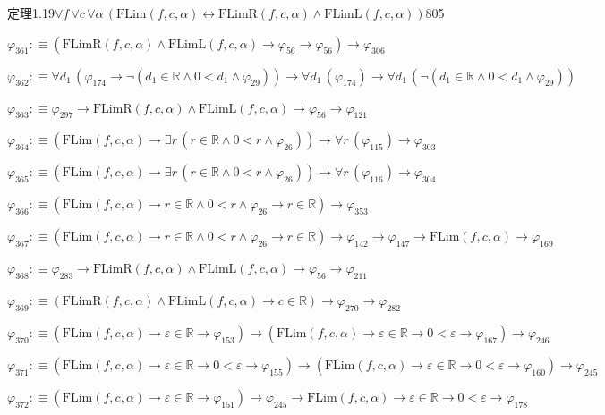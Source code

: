 \begin{fullproof}{定理1.19}{$\forall f\,\forall c\,\forall \alpha\,(\mathrm{FLim}(f,c,\alpha) \leftrightarrow \mathrm{FLimR}(f,c,\alpha) \land \mathrm{FLimL}(f,c,\alpha))$}{805}
\begin{abbrevlist}
\item $\varphi_{361} :\equiv (\mathrm{FLimR}(f,c,\alpha) \land \mathrm{FLimL}(f,c,\alpha) \to \varphi_{56} \to \varphi_{56}) \to \varphi_{306}$
\item $\varphi_{362} :\equiv \forall d_{1}\,(\varphi_{174} \to \neg (d_{1} \in \mathbb{R} \land 0 < d_{1} \land \varphi_{29})) \to \forall d_{1}\,(\varphi_{174}) \to \forall d_{1}\,(\neg (d_{1} \in \mathbb{R} \land 0 < d_{1} \land \varphi_{29}))$
\item $\varphi_{363} :\equiv \varphi_{297} \to \mathrm{FLimR}(f,c,\alpha) \land \mathrm{FLimL}(f,c,\alpha) \to \varphi_{56} \to \varphi_{121}$
\item $\varphi_{364} :\equiv (\mathrm{FLim}(f,c,\alpha) \to \exists r\,(r \in \mathbb{R} \land 0 < r \land \varphi_{26})) \to \forall r\,(\varphi_{115}) \to \varphi_{303}$
\item $\varphi_{365} :\equiv (\mathrm{FLim}(f,c,\alpha) \to \exists r\,(r \in \mathbb{R} \land 0 < r \land \varphi_{26})) \to \forall r\,(\varphi_{116}) \to \varphi_{304}$
\item $\varphi_{366} :\equiv (\mathrm{FLim}(f,c,\alpha) \to r \in \mathbb{R} \land 0 < r \land \varphi_{26} \to r \in \mathbb{R}) \to \varphi_{353}$
\item $\varphi_{367} :\equiv (\mathrm{FLim}(f,c,\alpha) \to r \in \mathbb{R} \land 0 < r \land \varphi_{26} \to r \in \mathbb{R}) \to \varphi_{142} \to \varphi_{147} \to \mathrm{FLim}(f,c,\alpha) \to \varphi_{169}$
\item $\varphi_{368} :\equiv \varphi_{283} \to \mathrm{FLimR}(f,c,\alpha) \land \mathrm{FLimL}(f,c,\alpha) \to \varphi_{56} \to \varphi_{211}$
\item $\varphi_{369} :\equiv (\mathrm{FLimR}(f,c,\alpha) \land \mathrm{FLimL}(f,c,\alpha) \to c \in \mathbb{R}) \to \varphi_{270} \to \varphi_{282}$
\item $\varphi_{370} :\equiv (\mathrm{FLim}(f,c,\alpha) \to \varepsilon \in \mathbb{R} \to \varphi_{153}) \to (\mathrm{FLim}(f,c,\alpha) \to \varepsilon \in \mathbb{R} \to 0 < \varepsilon \to \varphi_{167}) \to \varphi_{246}$
\item $\varphi_{371} :\equiv (\mathrm{FLim}(f,c,\alpha) \to \varepsilon \in \mathbb{R} \to 0 < \varepsilon \to \varphi_{155}) \to (\mathrm{FLim}(f,c,\alpha) \to \varepsilon \in \mathbb{R} \to 0 < \varepsilon \to \varphi_{160}) \to \varphi_{245}$
\item $\varphi_{372} :\equiv (\mathrm{FLim}(f,c,\alpha) \to \varepsilon \in \mathbb{R} \to \varphi_{151}) \to \varphi_{245} \to \mathrm{FLim}(f,c,\alpha) \to \varepsilon \in \mathbb{R} \to 0 < \varepsilon \to \varphi_{178}$

\end{abbrevlist}
\end{fullproof}
